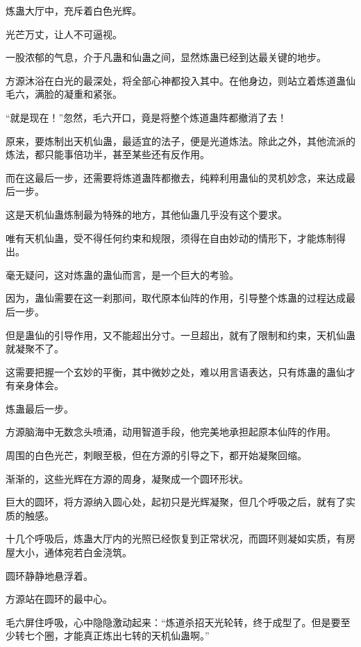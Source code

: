 
\begin{this_body}



炼蛊大厅中，充斥着白色光辉。

光芒万丈，让人不可逼视。

一股浓郁的气息，介于凡蛊和仙蛊之间，显然炼蛊已经到达最关键的地步。

方源沐浴在白光的最深处，将全部心神都投入其中。在他身边，则站立着炼道蛊仙毛六，满脸的凝重和紧张。

“就是现在！”忽然，毛六开口，竟是将整个炼道蛊阵都撤消了去！

原来，要炼制出天机仙蛊，最适宜的法子，便是光道炼法。除此之外，其他流派的炼法，都只能事倍功半，甚至某些还有反作用。

而在这最后一步，还需要将炼道蛊阵都撤去，纯粹利用蛊仙的灵机妙念，来达成最后一步。

这是天机仙蛊炼制最为特殊的地方，其他仙蛊几乎没有这个要求。

唯有天机仙蛊，受不得任何约束和规限，须得在自由妙动的情形下，才能炼制得出。

毫无疑问，这对炼蛊的蛊仙而言，是一个巨大的考验。

因为，蛊仙需要在这一刹那间，取代原本仙阵的作用，引导整个炼蛊的过程达成最后一步。

但是蛊仙的引导作用，又不能超出分寸。一旦超出，就有了限制和约束，天机仙蛊就凝聚不了。

这需要把握一个玄妙的平衡，其中微妙之处，难以用言语表达，只有炼蛊的蛊仙才有亲身体会。

炼蛊最后一步。

方源脑海中无数念头喷涌，动用智道手段，他完美地承担起原本仙阵的作用。

周围的白色光芒，刺眼至极，但在方源的引导之下，都开始凝聚回缩。

渐渐的，这些光辉在方源的周身，凝聚成一个圆环形状。

巨大的圆环，将方源纳入圆心处，起初只是光辉凝聚，但几个呼吸之后，就有了实质的触感。

十几个呼吸后，炼蛊大厅内的光照已经恢复到正常状况，而圆环则凝如实质，有房屋大小，通体宛若白金浇筑。

圆环静静地悬浮着。

方源站在圆环的最中心。

毛六屏住呼吸，心中隐隐激动起来：“炼道杀招天光轮转，终于成型了。但是要至少转七个圈，才能真正炼出七转的天机仙蛊啊。”


\end{this_body}
